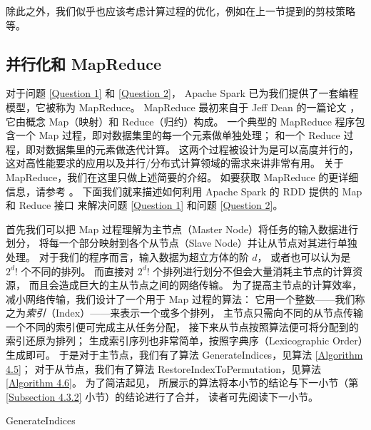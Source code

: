 除此之外，我们似乎也应该考虑计算过程的优化，例如在上一节提到的剪枝策略等。

\subsection{并行化和 MapReduce}
\label{Subsection 4.3.1}

对于问题 \ref{Question 1} 和 \ref{Question 2}，
Apache Spark 已为我们提供了一套编程模型，它被称为 MapReduce。
MapReduce 最初来自于 Jeff Dean 的一篇论文 \cite{Dean.2004}，
它由概念 Map（映射）和 Reduce（归约）构成。
一个典型的 MapReduce 程序包含一个 Map 过程，即对数据集里的每一个元素做单独处理；
和一个 Reduce 过程，即对数据集里的元素做迭代计算。
这两个过程被设计为是可以高度并行的，
这对高性能要求的应用以及并行/分布式计算领域的需求来讲非常有用。
关于 MapReduce，我们在这里只做上述简要的介绍。
如要获取 MapReduce 的更详细信息，请参考 \cite{Dean.2004}。
下面我们就来描述如何利用 Apache Spark 的 RDD 提供的 Map 和 Reduce 接口
来解决问题 \ref{Question 1} 和问题 \ref{Question 2}。

首先我们可以把 Map 过程理解为主节点（Master Node）将任务的输入数据进行划分，
将每一个部分映射到各个从节点（Slave Node）并让从节点对其进行单独处理。
对于我们的程序而言，输入数据为超立方体的阶 $d$，
或者也可以认为是 $2^d !$ 个不同的排列。
而直接对 $2^d !$ 个排列进行划分不但会大量消耗主节点的计算资源，
而且会造成巨大的主从节点之间的网络传输。
为了提高主节点的计算效率，减小网络传输，我们设计了一个用于 Map 过程的算法：
它用一个整数——我们称之为\emph{索引}（Index）——来表示一个或多个排列，
主节点只需向不同的从节点传输一个不同的索引便可完成主从任务分配，
接下来从节点按照算法便可将分配到的索引还原为排列；
生成索引序列也非常简单，按照字典序（Lexicographic Order）生成即可。
于是对于主节点，我们有了算法 GenerateIndices，见算法 \ref{Algorithm 4.5}；
对于从节点，我们有了算法 RestoreIndexToPermutation，见算法 \ref{Algorithm 4.6}。
为了简洁起见，
所展示的算法将本小节的结论与下一小节（第 \ref{Subsection 4.3.2} 小节）的结论进行了合并，
读者可先阅读下一小节。

\begin{algorithm}
\caption{GenerateIndices}
\label{Algorithm 4.5}
\begin{algorithmic}[1]
	 

	 
\end{algorithmic}
\end{algorithm}

